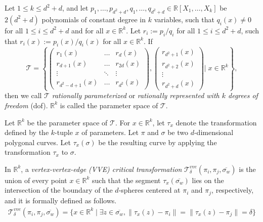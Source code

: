 \documentclass[thm-restate]{lipics-v2021}
\theoremstyle{remark}
\newcommand{\abse}[1]{\lVert #1 \rVert}
\newcommand{\reals}[0]{\mathbb{R}}
\newcommand{\trans}[0]{\mathcal{T}}
\newcommand{\vvetrans}[0]{\mathcal{T}^{vve}_\delta}
\newcommand{\cseg}[1]{\overline{#1}}
\begin{document}
\begin{definition} \label{def:para-trans}
    Let $1 \leq k \leq d^2 + d$, and let $p_1, \dots, p_{d^2+d}, q_1, \dots, q_{d^2+d} \in \mathbb{R}[X_1, \dots, X_k]$ be $2(d^2 + d)$ polynomials of constant degree in $k$ variables, such that $q_i(x) \neq 0$ for all $1 \leq i \leq d^2 + d$ and for all $x \in \mathbb{R}^k$. Let $r_i := p_i / q_i$ for all $1 \leq i \leq d^2 + d$, such that $r_i(x) := p_i(x) / q_i(x)$ for all $x \in \mathbb{R}^k$. If 
        \[
        \mathcal{T} = 
        \left\{
        \begin{pmatrix}
        r_1(x) & \dots & r_d(x) \\
        r_{d+1}(x) & \dots & r_{2d}(x) \\
        \vdots & \ddots & \vdots \\
        r_{d^2-d+1}(x) & \dots & r_{d^2}(x)
        \end{pmatrix}, 
        \begin{pmatrix}
            r_{d^2 + 1}(x) \\
            r_{d^2 + 2}(x) \\
            \vdots \\
            r_{d^2 + d}(x)
        \end{pmatrix}
        \Bigg| \; x \in \mathbb{R}^k
        \right\},
        \]
    then we call $\mathcal{T}$ \textit{rationally parameterized} or \textit{rationally represented with $k$ degrees of freedom} (dof). $\mathbb{R}^k$ is called the parameter space of $\mathcal{T}$.
\end{definition}

Let $\reals^k$ be the parameter space of $\trans$. For $x \in \reals^k$, let $\tau_x$ denote the transformation defined by the $k$-tuple $x$ of parameters. Let $\pi$ and $\sigma$ be two $d$-dimensional polygonal curves. Let $\tau_x(\sigma)$ be the resulting curve by applying the transformation $\tau_x$ to $\sigma$. 

In $\reals^k$, a \emph{vertex-vertex-edge (VVE) critical transformation} $\vvetrans(\pi_i, \pi_j, \cseg{\sigma_w})$ is the union of every point $x \in \reals^k$ such that the segment $\tau_x(\cseg{\sigma_w})$ lies on the intersection of the boundary of the $d$-spheres centered at $\pi_i$ and $\pi_j$, respectively, and it is formally defined as follows. 
\begin{align*}
    \vvetrans(\pi_i, \pi_j, \cseg{\sigma_w}) = \{x \in \reals^k \mid \exists z \in \cseg{\sigma_w}, \abse{\tau_x(z) - \pi_i} = \abse{\tau_x(z) - \pi_j} = \delta \}
\end{align*}
\end{document}
